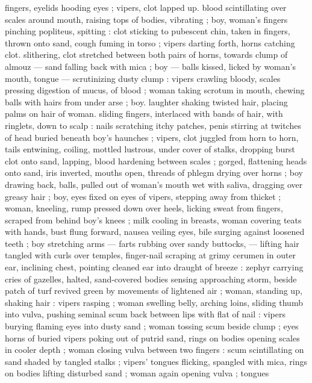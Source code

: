 fingers, eyelids hooding eyes ; vipers, clot lapped up. blood 
scintillating over scales around mouth, raising tops of bodies, 
vibrating ; boy, woman's fingers pinching popliteus, spitting : clot 
sticking to pubescent chin, taken in fingers, thrown onto sand, cough 
fuming in torso ; vipers darting forth, horns catching clot. slithering, 
clot stretched between both pairs of horns, towards clump of almouz 
--- sand falling back with mica ; boy --- balls kissed, licked by 
woman's mouth, tongue --- scrutinizing dusty clump : vipers crawling 
bloody, scales pressing digestion of mucus, of blood ; woman taking 
scrotum in mouth, chewing balls with hairs from under arse ; boy. 
laughter shaking twisted hair, placing palms on hair of woman. sliding 
fingers, interlaced with bands of hair, with ringlets, down to scalp : 
nails scratching itchy patches, penis stirring at twitches of head 
buried beneath boy's haunches ; vipers, clot juggled from horn to 
horn, tails entwining, coiling, mottled lustrous, under cover of stalks, 
dropping burst clot onto sand, lapping, blood hardening between 
scales ; gorged, flattening heads onto sand, iris inverted, mouths 
open, threads of phlegm drying over horns ; boy drawing back, balls, 
pulled out of woman's mouth wet with saliva, dragging over greasy 
hair ; boy, eyes fixed on eyes of vipers, stepping away from thicket ; 
woman, kneeling, rump pressed down over heels, licking sweat from 
fingers, scraped from behind boy's knees ; milk cooling in breasts, 
woman covering teats with hands, bust flung forward, nausea veiling 
eyes, bile surging against loosened teeth ; boy stretching arms --- 
farts rubbing over sandy buttocks, --- lifting hair tangled with curls 
over temples, finger-nail scraping at grimy cerumen in outer ear, 
inclining chest, pointing cleaned ear into draught of breeze : zephyr 
carrying cries of gazelles, halted, sand-covered bodies sensing 
approaching storm, beside patch of turf revived green by 
movements of lightened air ; woman, standing up, shaking hair : 
vipers rasping ; woman swelling belly, arching loins, sliding thumb 
into vulva, pushing seminal scum back between lips with flat of nail : 
vipers burying flaming eyes into dusty sand ; woman tossing scum 
beside clump ; eyes horns of buried vipers poking out of putrid 
sand, rings on bodies opening scales in cooler depth ; woman closing 
vulva between two fingers : scum scintillating on sand shaded by 
tangled stalks ; vipers' tongues flicking, spangled with mica, rings on 
bodies lifting disturbed sand ; woman again opening vulva ; tongues 
